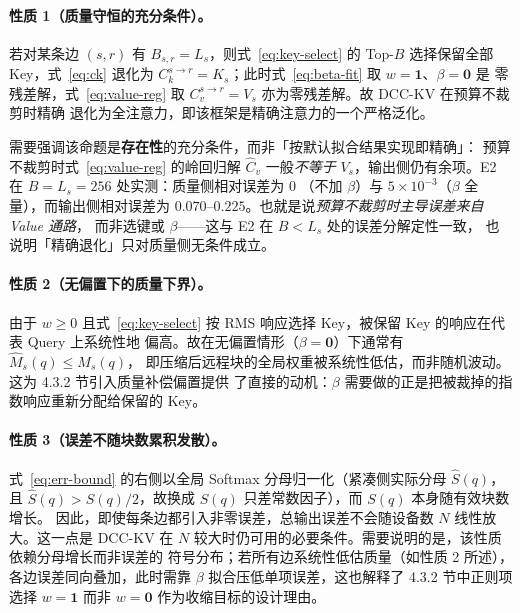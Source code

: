 \paragraph{性质 1（质量守恒的充分条件）。}
若对某条边 $(s,r)$ 有 $B_{s,r} = L_s$，则式~\eqref{eq:key-select} 的 Top-$B$ 选择保留全部 Key，式~\eqref{eq:ck}
退化为 $C_k^{s \to r} = K_s$；此时式~\eqref{eq:beta-fit} 取 $w = \mathbf{1}$、$\beta = \mathbf{0}$ 是
零残差解，式~\eqref{eq:value-reg} 取 $C_v^{s \to r} = V_s$ 亦为零残差解。故 DCC-KV 在预算不裁剪时精确
退化为全注意力，即该框架是精确注意力的一个严格泛化。

需要强调该命题是\textbf{存在性}的充分条件，而非「按默认拟合结果实现即精确」：
预算不裁剪时式~\eqref{eq:value-reg} 的岭回归解 $\widehat{C}_v$ 一般\emph{不等于}
$V_s$，输出侧仍有余项。E2 在 $B=L_s=256$ 处实测：质量侧相对误差为 $0$
（不加 $\beta$）与 $5\times10^{-3}$（$\beta$ 全量），而输出侧相对误差为
$0.070$--$0.225$。也就是说\emph{预算不裁剪时主导误差来自 Value 通路}，
而非选键或 $\beta$——这与 E2 在 $B<L_s$ 处的误差分解定性一致，
也说明「精确退化」只对质量侧无条件成立。

\paragraph{性质 2（无偏置下的质量下界）。}
由于 $w \ge 0$ 且式~\eqref{eq:key-select} 按 RMS 响应选择 Key，被保留 Key 的响应在代表 Query 上系统性地
偏高。故在无偏置情形（$\beta = \mathbf{0}$）下通常有 $\widehat{M}_s(q) \le M_s(q)$，
即压缩后远程块的全局权重被系统性低估，而非随机波动。这为 4.3.2 节引入质量补偿偏置提供
了直接的动机：$\beta$ 需要做的正是把被裁掉的指数响应重新分配给保留的 Key。

\paragraph{性质 3（误差不随块数累积发散）。}
式~\eqref{eq:err-bound} 的右侧以全局 Softmax 分母归一化（紧凑侧实际分母 $\widehat{S}(q)$，
且 $\widehat{S}(q) > S(q)/2$，故换成 $S(q)$ 只差常数因子），而 $S(q)$ 本身随有效块数增长。
因此，即使每条边都引入非零误差，总输出误差不会随设备数 $N$ 线性放大。这一点是
DCC-KV 在 $N$ 较大时仍可用的必要条件。需要说明的是，该性质依赖分母增长而非误差的
符号分布；若所有边系统性低估质量（如性质 2 所述），各边误差同向叠加，此时需靠 $\beta$
拟合压低单项误差，这也解释了 4.3.2 节中正则项选择 $w = \mathbf{1}$ 而非
$w = \mathbf{0}$ 作为收缩目标的设计理由。


